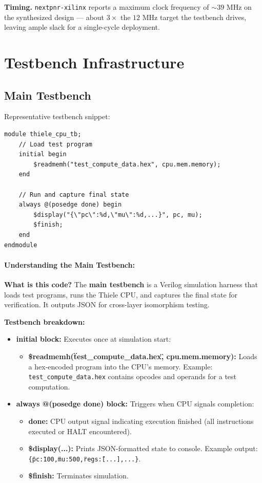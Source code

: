 \noindent\textbf{Timing.} \texttt{nextpnr-xilinx} reports a maximum clock
frequency of $\sim 39$ MHz on the synthesized design --- about $3\times$
the $12$ MHz target the testbench drives, leaving ample slack for a
single-cycle deployment.

\section{Testbench Infrastructure}

\subsection{Main Testbench}

Representative testbench snippet:
\begin{lstlisting}
module thiele_cpu_tb;
    // Load test program
    initial begin
        $readmemh("test_compute_data.hex", cpu.mem.memory);
    end
    
    // Run and capture final state
    always @(posedge done) begin
        $display("{\"pc\":%d,\"mu\":%d,...}", pc, mu);
        $finish;
    end
endmodule
\end{lstlisting}

\paragraph{Understanding the Main Testbench:}

\textbf{What is this code?} The \textbf{main testbench} is a Verilog simulation harness that loads test programs, runs the Thiele CPU, and captures the final state for verification. It outputs JSON for cross-layer isomorphism testing.

\textbf{Testbench breakdown:}
\begin{itemize}
    \item \textbf{initial block:} Executes once at simulation start:
    \begin{itemize}
        \item \textbf{\$readmemh(\"test\_compute\_data.hex\", cpu.mem.memory):} Loads a hex-encoded program into the CPU's memory. Example: \texttt{test\_compute\_data.hex} contains opcodes and operands for a test computation.
    \end{itemize}
    
    \item \textbf{always @(posedge done) block:} Triggers when CPU signals completion:
    \begin{itemize}
        \item \textbf{done:} CPU output signal indicating execution finished (all instructions executed or HALT encountered).
        \item \textbf{\$display(...):} Prints JSON-formatted state to console. Example output: \texttt{\{\"pc\":100,\"mu\":500,\"regs\":[...],...\}}.
        \item \textbf{\$finish:} Terminates simulation.
    \end{itemize}
\end{itemize}

